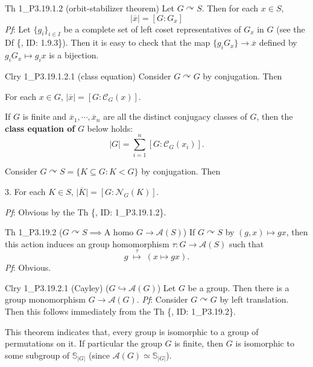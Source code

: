 \documentclass{article}
\newcommand{\act}{\curvearrowright}
\begin{document}
\begin{Th}{Th 1\_P3.19.1.2 (orbit-stabilizer theorem)}
    Let $G\act S$. Then for each $x\in S$, 
    $$ |\overline{x}| = [G: G_x] $$
    \tcblower
    \textit{Pf}: Let $\{g_i\}_{i\in I}$ be a complete set of left coset representatives of $G_x$ in $G$ (see the Df \{, ID: 1.9.3\}). Then it is easy to check that the map $\{g_i G_x\}\to \overline{x}$ defined by $g_i G_x \mapsto g_i x$ is a bijection. 
\end{Th}

\begin{Th}{Clry 1\_P3.19.1.2.1 (class equation)}
    Consider $G\act G$ by conjugation. Then
    \begin{compactenum}
        \item For each $x\in G$, $|\overline{x}| = [G: \mathcal{C}_G(x)]$.
        \item If $G$ is finite and $\overline{x}_1, \cdots, \overline{x}_n$ are all the distinct conjugacy classes of $G$, then the \textcolor{Df}{\textbf{class equation of}} $G$ below holds:
        $$ |G| = \sum_{i=1}^{n} [G: \mathcal{C}_G(x_i)]. $$
    \end{compactenum}
    Consider $G\act S = \{K\subseteq G: K<G\}$ by conjugation. Then
    \begin{compactenum}
        \item[3.] For each $K\in S$, $\big|\overline{K}\big| = [G: \mathcal{N}_G(K)]$.
    \end{compactenum}
    \tcblower
    \textit{Pf}: Obvious by the Th \{, ID: 1\_P3.19.1.2\}. 
\end{Th}

\begin{Th}{Th 1\_P3.19.2 ($G\act S \implies \text{A homo } G\to \mathcal{A}(S)$)}
    If $G\act S$ by $(g,x)\mapsto gx$, then this action induces an group homomorphism $\tau: G\to \mathcal{A}(S)$ such that 
    $$ g \;\overset{\tau}{\longmapsto}\; \left(x\mapsto gx\right). $$ 
    \tcblower
    \textit{Pf}: Obvious.
\end{Th}

\begin{Th}{Clry 1\_P3.19.2.1 (Cayley) ($G\hookrightarrow \mathcal{A}(G)$)}
    Let $G$ be a group. Then there is a group monomorphism $G\to\mathcal{A}(G)$.
    \tcblower
    \textit{Pf}: Consider $G\act G$ by left translation. Then this follows immediately from the Th \{, ID: 1\_P3.19.2\}.
\end{Th}

\begin{Rmk}{}
    \textcolor{Th}{This theorem indicates that, every group is isomorphic to a group of permutations on it. If particular the group $G$ is finite, then $G$ is isomorphic to some subgroup of $\mathbb{S}_{|G|}$ (since $\mathcal{A}(G)\simeq \mathbb{S}_{|G|}$).}
\end{Rmk}
\end{document}
